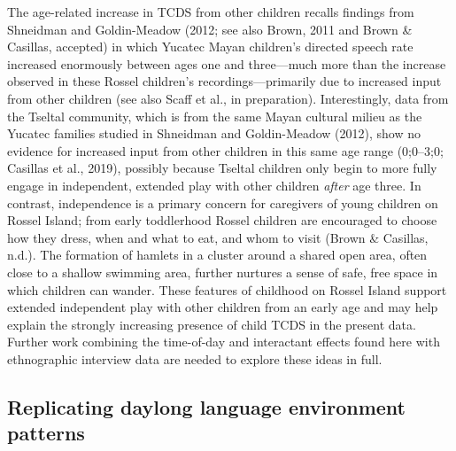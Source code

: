 \documentclass[
  english,
  ,man,floatsintext]{apa6}
\begin{document}
The age-related increase in TCDS from other children recalls findings from Shneidman and Goldin-Meadow (2012; see also Brown, 2011 and Brown \& Casillas, accepted) in which Yucatec Mayan children's directed speech rate increased enormously between ages one and three---much more than the increase observed in these Rossel children's recordings---primarily due to increased input from other children (see also Scaff et al., in preparation). Interestingly, data from the Tseltal community, which is from the same Mayan cultural milieu as the Yucatec families studied in Shneidman and Goldin-Meadow (2012), show no evidence for increased input from other children in this same age range (0;0--3;0; Casillas et al., 2019), possibly because Tseltal children only begin to more fully engage in independent, extended play with other children \emph{after} age three. In contrast, independence is a primary concern for caregivers of young children on Rossel Island; from early toddlerhood Rossel children are encouraged to choose how they dress, when and what to eat, and whom to visit (Brown \& Casillas, n.d.). The formation of hamlets in a cluster around a shared open area, often close to a shallow swimming area, further nurtures a sense of safe, free space in which children can wander. These features of childhood on Rossel Island support extended independent play with other children from an early age and may help explain the strongly increasing presence of child TCDS in the present data. Further work combining the time-of-day and interactant effects found here with ethnographic interview data are needed to explore these ideas in full.

\hypertarget{replicating-daylong-language-environment-patterns}{%
\subsection{Replicating daylong language environment patterns}\label{replicating-daylong-language-environment-patterns}}
\end{document}
